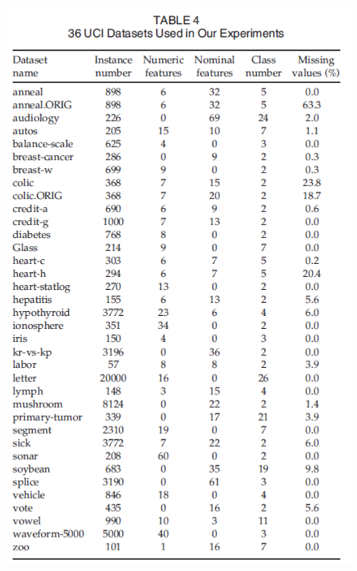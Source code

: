 \documentclass[12pt, a4paper]{article}
\begin{document}
\clearpage

\begin{figure}[h]
    \centering
    \includegraphics[width=\linewidth]{images/article2/table4.png}
    \caption{}
    \label{a2_table4}
\end{figure}

\clearpage
\end{document}
